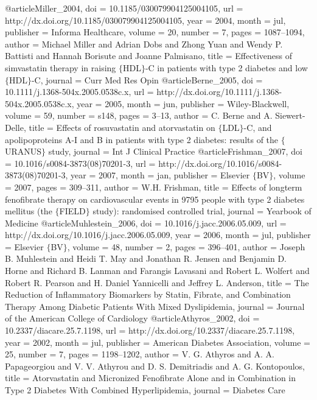 @article{Miller_2004,
	doi = {10.1185/030079904125004105},
	url = {http://dx.doi.org/10.1185/030079904125004105},
	year = 2004,
	month = {jul},
	publisher = {Informa Healthcare},
	volume = {20},
	number = {7},
	pages = {1087--1094},
	author = {Michael Miller and Adrian Dobs and Zhong Yuan and Wendy P. Battisti and Hannah Borisute and Joanne Palmisano},
	title = {Effectiveness of simvastatin therapy in raising $\lbrace$HDL$\rbrace$-C in patients with type 2 diabetes and low $\lbrace$HDL$\rbrace$-C},
	journal = {Curr Med Res Opin}
}
@article{Berne_2005,
	doi = {10.1111/j.1368-504x.2005.0538c.x},
	url = {http://dx.doi.org/10.1111/j.1368-504x.2005.0538c.x},
	year = 2005,
	month = {jun},
	publisher = {Wiley-Blackwell},
	volume = {59},
	number = {s148},
	pages = {3--13},
	author = {C. Berne and A. Siewert-Delle},
	title = {Effects of rosuvastatin and atorvastatin on $\lbrace$LDL$\rbrace$-C, and apolipoproteins A-I and B in patients with type 2 diabetes: results of the $\lbrace$URANUS$\rbrace$ study},
	journal = {Int J Clinical Practice}
}
@article{Frishman_2007,
	doi = {10.1016/s0084-3873(08)70201-3},
	url = {http://dx.doi.org/10.1016/s0084-3873(08)70201-3},
	year = 2007,
	month = {jan},
	publisher = {Elsevier $\lbrace$BV$\rbrace$},
	volume = {2007},
	pages = {309--311},
	author = {W.H. Frishman},
	title = {Effects of longterm fenofibrate therapy on cardiovascular events in 9795 people with type 2 diabetes mellitus (the $\lbrace$FIELD$\rbrace$ study): randomised controlled trial},
	journal = {Yearbook of Medicine}
}
@article{Muhlestein_2006,
	doi = {10.1016/j.jacc.2006.05.009},
	url = {http://dx.doi.org/10.1016/j.jacc.2006.05.009},
	year = 2006,
	month = {jul},
	publisher = {Elsevier $\lbrace$BV$\rbrace$},
	volume = {48},
	number = {2},
	pages = {396--401},
	author = {Joseph B. Muhlestein and Heidi T. May and Jonathan R. Jensen and Benjamin D. Horne and Richard B. Lanman and Farangis Lavasani and Robert L. Wolfert and Robert R. Pearson and H. Daniel Yannicelli and Jeffrey L. Anderson},
	title = {The Reduction of Inflammatory Biomarkers by Statin, Fibrate, and Combination Therapy Among Diabetic Patients With Mixed Dyslipidemia},
	journal = {Journal of the American College of Cardiology}
}
@article{Athyros_2002,
	doi = {10.2337/diacare.25.7.1198},
	url = {http://dx.doi.org/10.2337/diacare.25.7.1198},
	year = 2002,
	month = {jul},
	publisher = {American Diabetes Association},
	volume = {25},
	number = {7},
	pages = {1198--1202},
	author = {V. G. Athyros and A. A. Papageorgiou and V. V. Athyrou and D. S. Demitriadis and A. G. Kontopoulos},
	title = {Atorvastatin and Micronized Fenofibrate Alone and in Combination in Type 2 Diabetes With Combined Hyperlipidemia},
	journal = {Diabetes Care}
}
